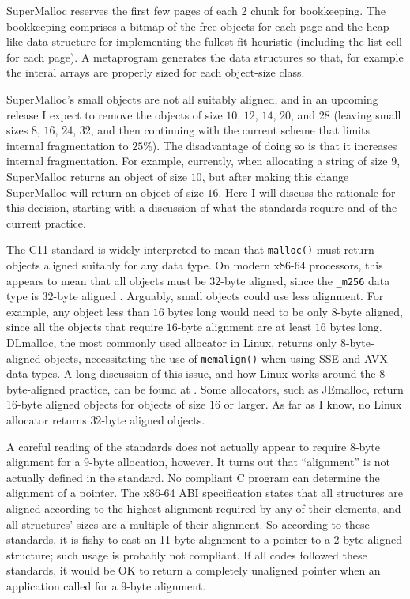 \documentclass[natbib,sort&compress,10pt]{sigplanconf}
\newcommand{\code}[1]{\texttt{#1}}
\begin{document}
SuperMalloc reserves the first few pages of each \unit{2}\mebi\byte{}
chunk for bookkeeping.  The bookkeeping comprises a bitmap of the free
objects for each page and the heap-like data structure for
implementing the fullest-fit heuristic (including the list cell for
each page).  A metaprogram generates the data structures so that, for
example the interal arrays are properly sized for each object-size
class.

SuperMalloc's small objects are not all suitably aligned, and in an
upcoming release I expect to remove the objects of size $10$, $12$,
$14$, $20$, and $28$ (leaving small sizes $8$, $16$, $24$, $32$, and
then continuing with the current scheme that limits internal
fragmentation to $25$\%).  The disadvantage of doing so is that it
increases internal fragmentation.  For example, currently, when
allocating a string of size $9$, SuperMalloc returns an object of size
$10$, but after making this change SuperMalloc will return an object
of size $16$.  Here I will discuss the rationale for this decision,
starting with a discussion of what the standards require and of the
current practice.

The C11 standard \cite{ISOIEC11} is widely interpreted to mean that
\code{malloc()} must return objects aligned suitably for any data
type. On modern x86-64 processors, this appears to mean that all
objects must be $32$-byte aligned, since the \code{\_m256} data type
is $32$-byte aligned \cite{MatzHuJa07}.  Arguably, small objects could
use less alignment.  For example, any object less than $16$ bytes long
would need to be only 8-byte aligned, since all the objects that
require $16$-byte alignment are at least $16$ bytes long.  DLmalloc,
the most commonly used allocator in Linux, returns only 8-byte-aligned
objects, necessitating the use of \code{memalign()} when using
SSE and AVX data types.  A long discussion of this issue, and how
Linux works around the 8-byte-aligned practice, can be found at
\cite{Schanda04}.  Some allocators, such as JEmalloc, return 16-byte
aligned objects for objects of size $16$ or larger.  As far as I know,
no Linux allocator returns $32$-byte aligned objects.

A careful reading of the standards \cite{ISOIEC11, MatzHuJa07} does
not actually appear to require $8$-byte alignment for a $9$-byte
allocation, however.  It turns out that ``alignment'' is not actually
defined in the standard.  No compliant C program can determine the
alignment of a pointer.  The x86-64 ABI specification
\cite{MatzHuJa07} states that all structures are aligned according to
the highest alignment required by any of their elements, and all
structures' sizes are a multiple of their alignment.  So according to
these standards, it is fishy to cast an 11-byte alignment to a pointer
to a 2-byte-aligned structure; such usage is probably not compliant.
If all codes followed these standards, it would be OK to return a
completely unaligned pointer when an application called for a $9$-byte
alignment.
\end{document}
